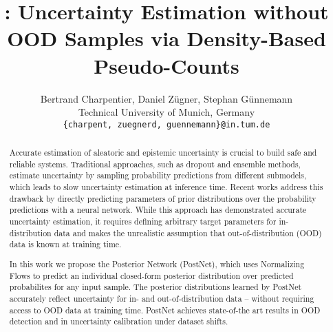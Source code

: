 \documentclass{article}
\title{\ours: Uncertainty Estimation without OOD Samples via Density-Based Pseudo-Counts}
\author{%
  Bertrand Charpentier, Daniel Z\"ugner, Stephan G\"unnemann\\
  Technical University of Munich, Germany\\
  \texttt{\{charpent, zuegnerd, guennemann\}@in.tum.de} \\
}
\begin{document}
\maketitle
\begin{abstract}
Accurate estimation of aleatoric and epistemic uncertainty is crucial to build safe and reliable systems. Traditional approaches, such as dropout and ensemble methods, estimate uncertainty by sampling probability predictions from different submodels, which leads to slow uncertainty estimation at inference time. Recent works address this drawback by directly predicting parameters of prior distributions over the probability predictions with a neural network. While this approach has demonstrated accurate uncertainty estimation, it requires defining arbitrary target parameters for in-distribution data and makes the unrealistic assumption that out-of-distribution (OOD) data is known at training time. 

In this work we propose the Posterior Network (PostNet), which uses Normalizing Flows to predict an individual closed-form posterior distribution over predicted probabilites for any input sample. The posterior distributions learned by PostNet accurately reflect uncertainty for in- and out-of-distribution data -- without requiring access to OOD data at training time. PostNet achieves state-of-the art results in OOD detection and in uncertainty calibration under dataset shifts.
\end{abstract}











\clearpage

\end{document}
